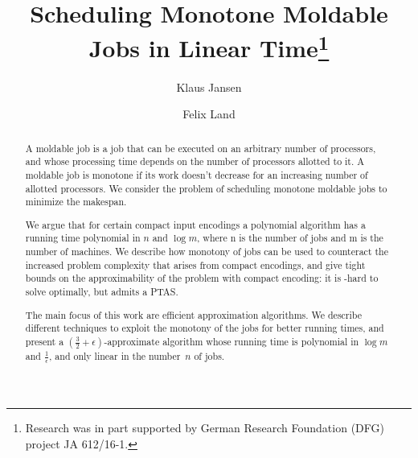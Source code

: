 \documentclass[12pt,a4paper]{article}
\title{Scheduling Monotone Moldable Jobs in Linear Time\footnote{%
  Research was in part supported by German Research Foundation (DFG) project JA 612/16-1.
}}
\author{Klaus Jansen \and Felix Land}
\theoremstyle{plain}
\theoremstyle{definition}
\begin{document}
\maketitle


\begin{abstract}
  A moldable job is a job that can be executed on an arbitrary number of processors,
  and whose processing time depends on the number of processors allotted to it.
  A moldable job is monotone if its work doesn't decrease
  for an increasing number of allotted processors.
  We consider the problem of scheduling monotone moldable jobs to minimize the makespan.
  
  We argue that for certain compact input encodings
  a polynomial algorithm has a running time polynomial in $n$ and $\log m$,
  where n is the number of jobs and m is the number of machines.
  We describe how monotony of jobs can be used to counteract the
  increased problem complexity that arises from compact encodings,
  and give tight bounds on the approximability of the problem with compact encoding:
  it is -hard to solve optimally, but admits a PTAS.
  
  The main focus of this work are efficient approximation algorithms.
  We describe different techniques to exploit the monotony of the jobs for better running times,
  and present a $(\frac{3}{2}+\epsilon)$-approximate algorithm
  whose running time is polynomial in $\log m$ and $\frac{1}{\epsilon}$,
  and only linear in the number~$n$ of jobs.
\end{abstract}









\end{document}
